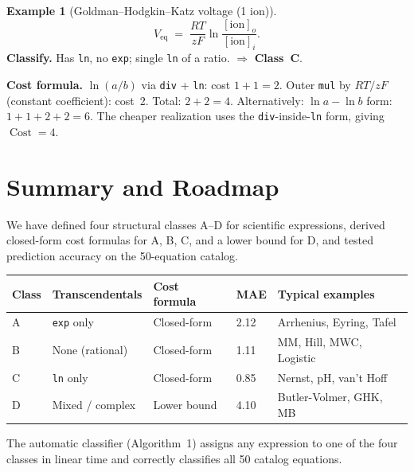 \documentclass[12pt,a4paper]{article}
\theoremstyle{definition}
\newtheorem{example}[theorem]{Example}
\newcommand{\Cost}{\operatorname{Cost}}
\begin{document}
\begin{example}[Goldman--Hodgkin--Katz voltage (1 ion)]
\[
  V_{\mathrm{eq}} \;=\; \frac{RT}{zF} \ln\!\frac{[\mathrm{ion}]_o}{[\mathrm{ion}]_i}.
\]
\textbf{Classify.} Has \texttt{ln}, no \texttt{exp}; single \texttt{ln} of a
ratio.
$\Rightarrow$ \textbf{Class~C}.

\textbf{Cost formula.}
$\ln(a/b)$ via \texttt{div} + \texttt{ln}: cost $1 + 1 = 2$.
Outer \texttt{mul} by $RT/zF$ (constant coefficient): cost~2.
Total: $2 + 2 = 4$.
Alternatively: $\ln a - \ln b$ form: $1 + 1 + 2 + 2 = 6$.
The cheaper realization uses the \texttt{div}-inside-\texttt{ln} form,
giving $\Cost = 4$.
\end{example}

\section{Summary and Roadmap}
\label{sec:summary}

We have defined four structural classes A--D for scientific expressions,
derived closed-form cost formulas for A, B, C, and a lower bound for D,
and tested prediction accuracy on the 50-equation catalog.

\begin{center}
\begin{tabular}{@{}lllll@{}}
\toprule
\textbf{Class} & \textbf{Transcendentals} & \textbf{Cost formula} & \textbf{MAE} & \textbf{Typical examples} \\
\midrule
A & \texttt{exp} only     & Closed-form & 2.12 & Arrhenius, Eyring, Tafel \\
B & None (rational)       & Closed-form & 1.11 & MM, Hill, MWC, Logistic \\
C & \texttt{ln} only      & Closed-form & 0.85 & Nernst, pH, van't Hoff \\
D & Mixed / complex       & Lower bound & 4.10 & Butler-Volmer, GHK, MB \\
\bottomrule
\end{tabular}
\end{center}

The automatic classifier (Algorithm~1) assigns any expression to one of the
four classes in linear time and correctly classifies all 50 catalog equations.
\end{document}
